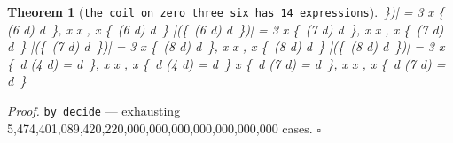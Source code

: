 \documentclass[11pt]{article}
\newtheorem{theorem}{Theorem}[section]
\begin{document}
\begin{theorem}[\texttt{the\_coil\_on\_zero\_three\_six\_has\_14\_expressions}]
\,\}\right)\right| = 3 \land \forall x \in \{\, \mathopen{}\left(6 \cdot d\right) \mid d \in [0,\,1,\,8] \,\},\; x \in [0,\,3,\,6] \land \forall x \in [0,\,3,\,6],\; x \in \{\, \mathopen{}\left(6 \cdot d\right) \mid d \in [0,\,1,\,8] \,\} \land \left|\left(\{\, \mathopen{}\left(6 \cdot d\right) \mid d \in [0,\,1,\,8] \,\}\right)\right| = 3 \land \forall x \in \{\, \mathopen{}\left(7 \cdot d\right) \mid d \in [3,\,6,\,0] \,\},\; x \in [0,\,3,\,6] \land \forall x \in [0,\,3,\,6],\; x \in \{\, \mathopen{}\left(7 \cdot d\right) \mid d \in [3,\,6,\,0] \,\} \land \left|\left(\{\, \mathopen{}\left(7 \cdot d\right) \mid d \in [3,\,6,\,0] \,\}\right)\right| = 3 \land \forall x \in \{\, \mathopen{}\left(8 \cdot d\right) \mid d \in [3,\,6,\,0] \,\},\; x \in [0,\,3,\,6] \land \forall x \in [0,\,3,\,6],\; x \in \{\, \mathopen{}\left(8 \cdot d\right) \mid d \in [3,\,6,\,0] \,\} \land \left|\left(\{\, \mathopen{}\left(8 \cdot d\right) \mid d \in [3,\,6,\,0] \,\}\right)\right| = 3 \land \forall x \in \{\, d \in [0,\,1,\,2,\,3,\,4,\,5,\,6,\,7,\,8] \mid {}\mathopen{}\left(4 \cdot d\right) = d \,\},\; x \in [0,\,3,\,6] \land \forall x \in [0,\,3,\,6],\; x \in \{\, d \in [0,\,1,\,2,\,3,\,4,\,5,\,6,\,7,\,8] \mid {}\mathopen{}\left(4 \cdot d\right) = d \,\} \land \forall x \in \{\, d \in [0,\,1,\,2,\,3,\,4,\,5,\,6,\,7,\,8] \mid {}\mathopen{}\left(7 \cdot d\right) = d \,\},\; x \in [0,\,3,\,6] \land \forall x \in [0,\,3,\,6],\; x \in \{\, d \in [0,\,1,\,2,\,3,\,4,\,5,\,6,\,7,\,8] \mid {}\mathopen{}\left(7 \cdot d\right) = d \,\} \]
\end{theorem}
\noindent\emph{Proof.} \texttt{by decide} --- exhausting 5,474,401,089,420,220,000,000,000,000,000,000,000 cases. \hfill$\square$
\end{document}

